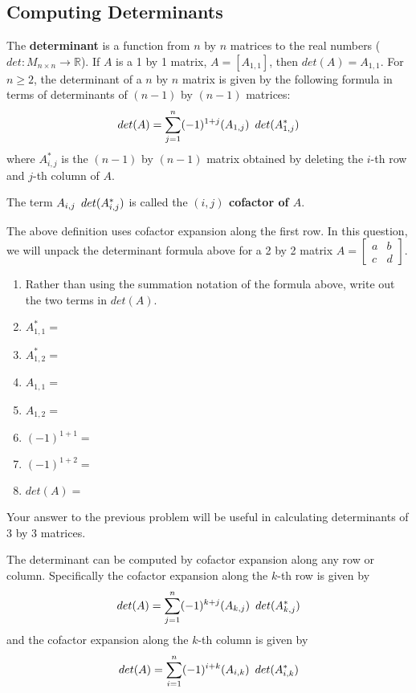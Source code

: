 \subsection{Computing Determinants}
\begin{definition}
The \textbf{determinant} is a function from $n$ by $n$ matrices to the real numbers ($det:M_{n \times n} \rightarrow \mathbb{R}$). If $A$ is a 1 by 1 matrix, $A=[A_{1,1}]$, then $det(A)=A_{1,1}$. For $n \geq 2$, the determinant of a $n$ by $n$ matrix is given by the following formula in terms of determinants of $(n-1)$ by $(n-1)$ matrices:
$$det(A)=\sum_{j=1}^n (-1)^{1+j} (A_{1,j}) \enskip det(A^*_{1,j})$$
where $A^*_{i,j}$ is the $(n-1)$ by $(n-1)$ matrix obtained by deleting the $i$-th row and $j$-th column of $A$.

The term $A_{i,j}\enskip det(A^*_{i,j})$ is called the \textbf{$(i,j)$ cofactor of $A$}.

\end{definition}
The above definition uses cofactor expansion along the first row.
\bq In this question, we will unpack the determinant formula above for a 2 by 2 matrix $A=\begin{bmatrix} a&b \\c&d \end{bmatrix}$.
\begin{enumerate}
\item Rather than using the summation notation of the formula above, write out the two terms in $det(A)$.
\item $A^*_{1,1}=$
\item $A^*_{1,2}=$
\item $A_{1,1}=$
\item $A_{1,2}=$
\item $(-1)^{1+1}=$
\item $(-1)^{1+2}=$
\item $det(A)=$
\end{enumerate}
\eq
Your answer to the previous problem will be useful in calculating determinants of 3 by 3 matrices.
\begin{theorem}
The determinant can be computed by cofactor expansion along any row or column. Specifically the cofactor expansion along the $k$-th row is given by $$det(A)=\sum_{j=1}^n (-1)^{k+j} (A_{k,j}) \enskip det(A^*_{k,j})$$
and the cofactor expansion along the $k$-th column is given by
$$det(A)=\sum_{i=1}^n (-1)^{i+k} (A_{i,k}) \enskip det(A^*_{i,k})$$
\end{theorem}

